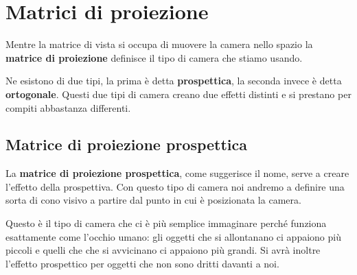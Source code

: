\section{Matrici di proiezione}
Mentre la matrice di vista si occupa di muovere la camera nello spazio la \textbf{matrice di proiezione} definisce il
tipo di camera che stiamo usando.

Ne esistono di due tipi, la prima \`e detta \textbf{prospettica}, la seconda invece \`e detta \textbf{ortogonale}.
Questi due tipi di camera creano due effetti distinti e si prestano per compiti abbastanza differenti.

\subsection{Matrice di proiezione prospettica}
La \textbf{matrice di proiezione prospettica}, come suggerisce il nome, serve a creare l'effetto della prospettiva.
Con questo tipo di camera noi andremo a definire una sorta di cono visivo a partire dal punto in cui \`e posizionata
la camera.

Questo \`e il tipo di camera che ci \`e pi\`u semplice immaginare perch\'e funziona esattamente come l'occhio umano: gli
oggetti che si allontanano ci appaiono pi\`u piccoli e quelli che che si avvicinano ci appaiono pi\`u grandi. Si avr\`a
inoltre l'effetto prospettico per oggetti che non sono dritti davanti a noi.

\begin{center}
\end{center}
